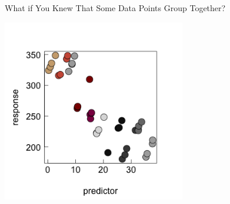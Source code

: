 \documentclass{beamer}
\begin{document}
\begin{frame}{What if You Knew That Some Data Points Group Together?}
  \begin{center}
    \includegraphics[width=0.6\textwidth]{lectures/day_1_intro_to_mems/figures/unnamed-chunk-12-1.png} %
  \end{center}
\end{frame}
\end{document}
